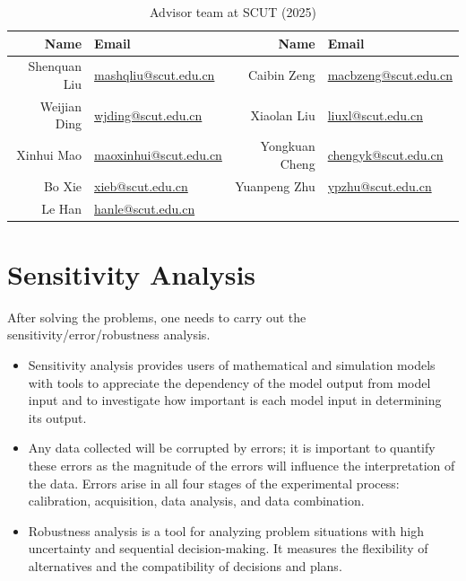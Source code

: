 \documentclass[12pt]{article}  %
\begin{document}
 \begin{table}[htbp]
     \begin{center}		
         \caption{Advisor team at SCUT (2025)}
         \begin{tabular}{rlrl} %
             \toprule[2pt]
             \multicolumn{1}{m{2cm}}{\centering Name}
             &\multicolumn{1}{m{4cm}}{\centering Email}	& \multicolumn{1}{m{2cm}}{\centering Name}
             &\multicolumn{1}{m{4cm}}{\centering Email}\\ %
             \midrule
             Shenquan Liu   & \href{mailto:mashqliu@scut.edu.cn}{mashqliu@scut.edu.cn} & Caibin Zeng & \href{mailto:macbzeng@scut.edu.cn}{macbzeng@scut.edu.cn}\\
             Weijian Ding   & \href{mailto:wjding@scut.edu.cn}{wjding@scut.edu.cn} & Xiaolan Liu & \href{mailto:liuxl@scut.edu.cn}{liuxl@scut.edu.cn} \\
             Xinhui Mao   & \href{mailto:maoxinhui@scut.edu.cn}{maoxinhui@scut.edu.cn} & Yongkuan Cheng & \href{mailto:chengyk@scut.edu.cn}{chengyk@scut.edu.cn} \\
             Bo Xie   & \href{mailto:xieb@scut.edu.cn}{xieb@scut.edu.cn} & Yuanpeng Zhu & \href{mailto:ypzhu@scut.edu.cn}{ypzhu@scut.edu.cn} \\
             Le Han   & \href{mailto:hanle@scut.edu.cn}{hanle@scut.edu.cn} & &\\
             \bottomrule[2pt]
         \end{tabular}	\label{tab4} %
     \end{center}
 \end{table}
 
 \section{Sensitivity Analysis}
 
 After solving the problems, one needs to carry out the sensitivity/error/robustness analysis.
 
 \begin{itemize}
     \setlength{\parsep}{0ex} %
     \setlength{\topsep}{2ex} %
     \setlength{\itemsep}{1ex} %
     \item Sensitivity analysis provides users of mathematical and simulation models with tools to appreciate the dependency of the model output from model input and to investigate how important is each model input in determining its output.
     \item Any data collected will be corrupted by errors; it is important to quantify these errors as the magnitude of the errors will influence the interpretation of the data. Errors arise in all four stages of the experimental process: calibration, acquisition, data analysis, and data combination.
     \item Robustness analysis is a tool for analyzing problem situations with high uncertainty and sequential decision-making. It measures the flexibility of alternatives and the compatibility of decisions and plans.
 \end{itemize}
 
\end{document}

